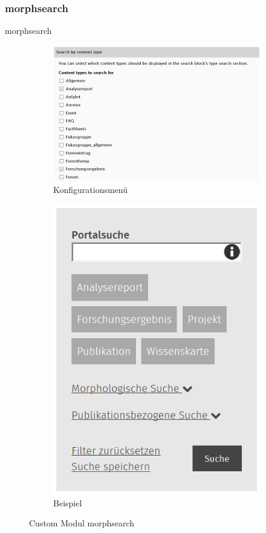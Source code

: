 \subsubsection{morphsearch}\label{subsub:morphsearch}
morphsearch
\begin{figure}[H]
	\centering
	\begin{subfigure}[a]{0.4\textwidth}
		\centering
		\includegraphics[height=0.20\textheight]{images/config_morphsearch}
		\caption[]{Konfigurationsmenü}
		\label{fig:config_morphsearch}
	\end{subfigure}
	\begin{subfigure}[A]{0.4\textwidth}
		\centering
		\includegraphics[height=0.20\textheight]{images/example_morphsearch}
		\caption[]{Beispiel}
		\label{fig:example_morphsearch}
	\end{subfigure}
	\caption{Custom Modul morphsearch}
	\label{fig:morphsearch}
\end{figure}



